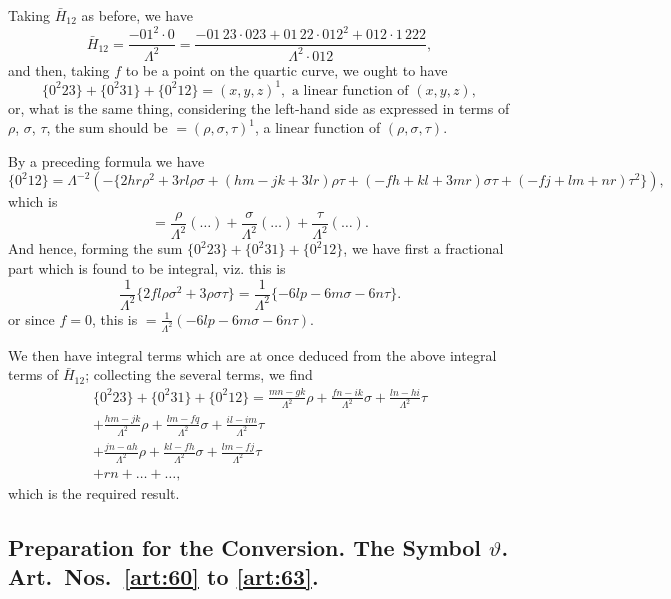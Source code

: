 \documentclass[11pt,a4paper]{book}
\begin{document}
\begin{art}\label{art:59}
Taking $\bar{H}_{12}$ as before, we have
\[
\bar{H}_{12} = \frac{-01^2 \cdot 0}{\Lambda^2} = \frac{-01\,23 \cdot 023 + 01\,22 \cdot 012^2 + 012 \cdot 1\,222}{\Lambda^2 \cdot 012},
\]
and then, taking $f$ to be a point on the quartic curve, we ought to have
\[
\{0^2 23\} + \{0^2 31\} + \{0^2 12\} = (x, y, z)^1, \text{ a linear function of } (x, y, z),
\]
or, what is the same thing, considering the left-hand side as expressed in terms of $\rho$, $\sigma$, $\tau$, the sum should be $= (\rho, \sigma, \tau)^1$, a linear function of $(\rho, \sigma, \tau)$.

By a preceding formula we have
\[
\{0^2 12\} = \Lambda^{-2}(-\{2hr\rho^2 + 3rl\rho\sigma + (hm - jk + 3lr)\rho\tau + (-fh + kl + 3mr)\sigma\tau + (-fj + lm + nr)\tau^2\}),
\]
which is
\[
= \frac{\rho}{\Lambda^2}(\ldots) + \frac{\sigma}{\Lambda^2}(\ldots) + \frac{\tau}{\Lambda^2}(\ldots).
\]
And hence, forming the sum $\{0^2 23\} + \{0^2 31\} + \{0^2 12\}$, we have first a fractional part which is found to be integral, viz. this is
\[
\frac{1}{\Lambda^2}\{2fl\rho\sigma^2 + 3\rho\sigma\tau\} = \frac{1}{\Lambda^2}\{-6lp - 6m\sigma - 6n\tau\}.
\]
or since $f = 0$, this is $= \frac{1}{\Lambda^2}(-6lp - 6m\sigma - 6n\tau)$.

We then have integral terms which are at once deduced from the above integral terms of $\bar{H}_{12}$; collecting the several terms, we find
\begin{multline*}
\{0^2 23\} + \{0^2 31\} + \{0^2 12\} = \frac{mn - gk}{\Lambda^2}\rho + \frac{fn - ik}{\Lambda^2}\sigma + \frac{ln - hi}{\Lambda^2}\tau \\
+ \frac{hm - jk}{\Lambda^2}\rho + \frac{lm - fq}{\Lambda^2}\sigma + \frac{il - im}{\Lambda^2}\tau \\
+ \frac{jn - ah}{\Lambda^2}\rho + \frac{kl - fh}{\Lambda^2}\sigma + \frac{lm - fj}{\Lambda^2}\tau \\
+ rn + \ldots + \ldots,
\end{multline*}
which is the required result.
\end{art}

\newpage
\subsection*{Preparation for the Conversion. The Symbol $\vartheta$. Art.~Nos.~\ref{art:60} to \ref{art:63}.}
\end{document}
